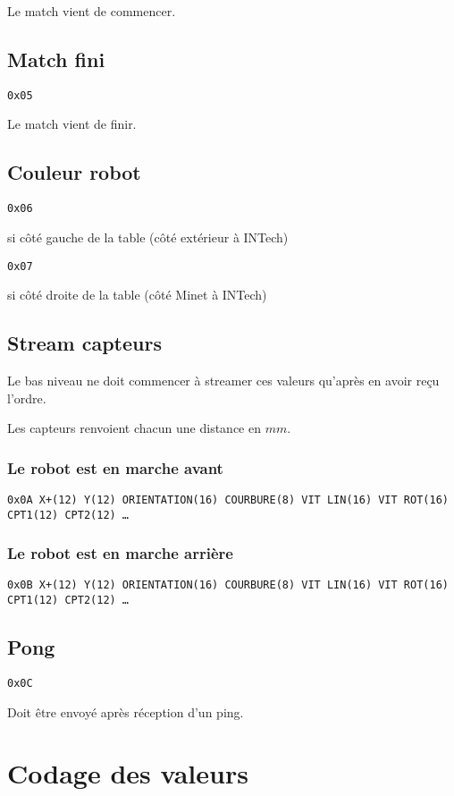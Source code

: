 \documentclass[a4paper, 12pt]{article}
\begin{document}
Le match vient de commencer.
    
\subsection{Match fini}
    \texttt{0x05}
    
Le match vient de finir.
    
\subsection{Couleur robot}
    \texttt{0x06}
    
    si côté gauche de la table (côté extérieur à INTech)
    
    \texttt{0x07}
    
    si côté droite de la table (côté Minet à INTech)
    
\subsection{Stream capteurs}

Le bas niveau ne doit commencer à streamer ces valeurs qu'après en avoir reçu l'ordre.

Les capteurs renvoient chacun une distance en $mm$.

\subsubsection{Le robot est en marche avant}
    \texttt{0x0A X+(12) Y(12) ORIENTATION(16) COURBURE(8) VIT  LIN(16) VIT  ROT(16) CPT1(12) CPT2(12) …}
    
\subsubsection{Le robot est en marche arrière}
    \texttt{0x0B X+(12) Y(12) ORIENTATION(16) COURBURE(8) VIT  LIN(16) VIT  ROT(16) CPT1(12) CPT2(12) …}

\subsection{Pong}
     \texttt{0x0C}

Doit être envoyé après réception d'un ping.

\section{Codage des valeurs}
\end{document}

